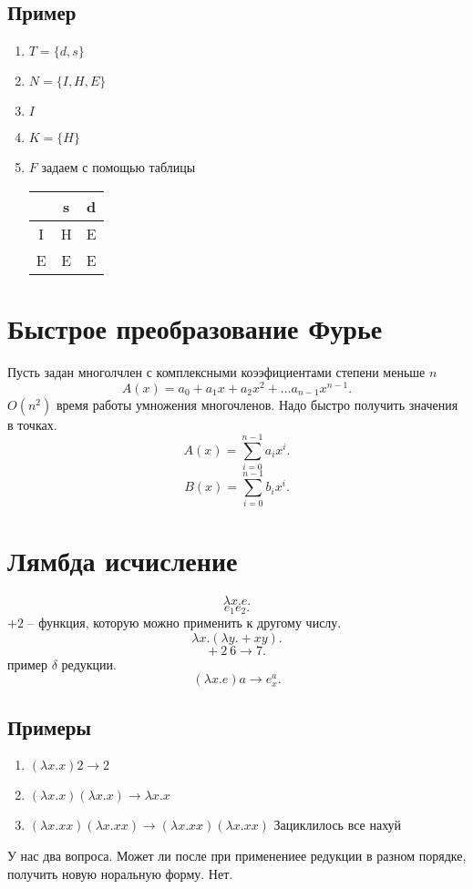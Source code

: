 \documentclass[14pt]{extarticle}
\begin{document}
\subsection{Пример}
\begin{enumerate}
    \item $T = \{d,s\}$
    \item  $N = \{I,H,E\}$
    \item  $I$
    \item  $K = \{H\}$ 
    \item $F$ задаем с помощью таблицы\\
        \begin{tabular}{|c|c|c|}
            \hline
            & s & d\\
            \hline
            I & H & E\\
            \hline
            E & E & E\\
            \hline
        \end{tabular}
\end{enumerate}
\section{Быстрое преобразование Фурье}
Пусть задан многолчлен с комплексными коээфициентами степени меньше $n$
 \[
     A(x) = a_0 + a_1 x + a_2 x^2 + \dots a_{n - 1} x^{n-1}
.\] 
$O(n^2)$ время работы умножения многочленов. Надо быстро получить значения в точках. 
\[
    A(x) = \sum_{i=0}^{n-1} a_{i} x^{i}
.\] 
\[
    B(x) = \sum_{i=0}^{n-1} b_{i} x^{i}
.\] 
\section{Лямбда исчисление}
\[
\lambda x. e
.\] 
\[
e_1 e_2
.\] 
$+2$ -- функция, которую можно применить к другому числу.
 \[
\lambda x. (\lambda y . + x y)
.\] 
\[
    +~2 ~6 \to 7
.\] 
пример $\delta$ редукции.  
\[
    (\lambda x.e) a \to e_{x}^{a}
.\] 
\subsection{Примеры}
\begin{enumerate}
    \item $(\lambda x. x) 2 \to  2$
    \item  $(\lambda x. x) (\lambda x.x) \to \lambda x.x$
    \item  $(\lambda x. x x)(\lambda x. x x) \to (\lambda x .x x) (\lambda x.x x)$
         Зациклилось все нахуй
\end{enumerate}
У нас два вопроса. Может ли после при применениее редукции в разном порядке, получить новую норальную форму. Нет.
\end{document}
